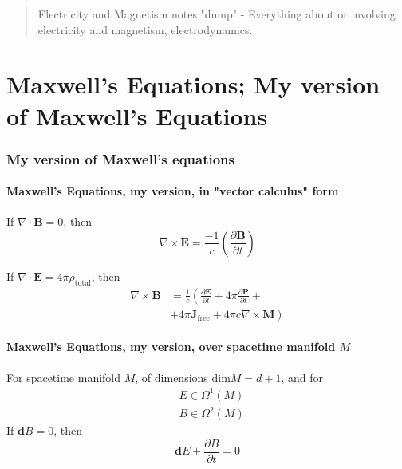 \documentclass[10pt]{amsart}
\begin{document}
\begin{multicols*}{2}


\begin{abstract}
Electricity and Magnetism notes "dump" - Everything about or involving electricity and magnetism, electrodynamics.

\end{abstract}

\part{Maxwell's Equations; My version of Maxwell's Equations}

\section{My version of Maxwell's equations}

\subsection{Maxwell's Equations, my version, in "vector calculus" form}

If $\nabla \cdot \mathbf{B} = 0$, then
\begin{equation}
	\nabla \times \mathbf{E} = \frac{-1}{c} \left( \frac{ \partial \mathbf{B} }{\partial t} \right)
\end{equation}

If $\nabla \cdot \mathbf{E} = 4\pi \rho_{\text{total}}$, then 
\begin{equation}
\begin{aligned}
	\nabla \times \mathbf{B} & = \frac{1}{c} \left( \frac{ \partial \mathbf{E}}{ \partial t} + 4\pi \frac{ \partial \mathbf{P} }{ \partial t} +  \right.  \\
	& \left.   + 4\pi \mathbf{J}_{\text{free}} + 4\pi c \nabla \times \mathbf{M}  \right)
\end{aligned}
\end{equation}

\subsection{Maxwell's Equations, my version, over spacetime manifold $M$}

For spacetime manifold $M$, of dimensions $\text{dim}M = d+1$, and for 
\[
\begin{aligned}
	& E \in \Omega^1(M) \\ 
	& B \in \Omega^2(M)
\end{aligned}
\]
If $\mathbf{d}B=0$, then 
\begin{equation}\label{Eq:MaxwellsEqnsDGEBInduction}
\boxed{ 	\mathbf{d}E + \frac{ \partial B}{ \partial t} = 0  }
\end{equation}


\end{multicols*}
\end{document}

